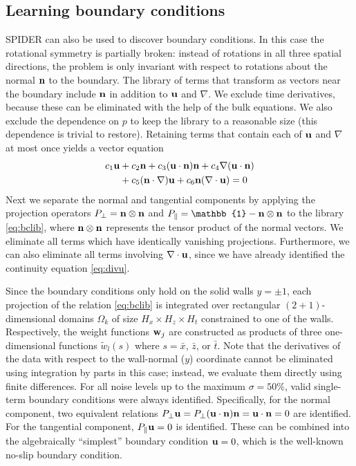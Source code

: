 \documentclass[9pt,twocolumn,twoside,lineno]{pnas-new}
\begin{document}
\subsection*{Learning boundary conditions}
SPIDER can also be used to discover boundary conditions. In this case the rotational symmetry is partially broken: instead of rotations in all three spatial directions, the problem is only invariant with respect to rotations about the normal ${\bf n}$ to the boundary. The library of terms that transform as vectors near the boundary include ${\bf n}$ in addition to ${\bf u}$ and $\nabla$. We exclude time derivatives, because these can be eliminated with the help of the bulk equations. We also exclude the dependence on $p$ to keep the library to a reasonable size (this dependence is trivial to restore). Retaining terms that contain each of ${\bf u}$ and $\nabla$ at most once yields a vector equation
\begin{align}\label{eq:bclib}
    c_1{\bf u}&+c_2{\bf n}+c_3({\bf u} \cdot {\bf n}){\bf n}+c_4\nabla({\bf u} \cdot {\bf n})\nonumber\\&+c_5({\bf n}\cdot \nabla){\bf u}+c_6{\bf n}(\nabla \cdot {\bf u})= 0
\end{align}
Next we separate the normal and tangential components by applying the projection operators $P_\perp={\bf n}\otimes{\bf n}$ and $P_\parallel=\mathbb{1}-{\bf n}\otimes{\bf n}$ to the library \eqref{eq:bclib}, where ${\bf n}\otimes{\bf n}$ represents the tensor product of the normal vectors. We eliminate all terms which have identically vanishing projections. Furthermore, we can also eliminate all terms involving $\nabla\cdot{\bf u}$, since we have already identified the continuity equation \eqref{eq:divu}.

Since the boundary conditions only hold on the solid walls $y=\pm 1$, each projection of the relation \eqref{eq:bclib} is integrated over rectangular $(2+1)$-dimensional domains $\Omega_k$ of size $H_x\times H_z\times H_t$ constrained to one of the walls. Respectively, the weight functions ${\bf w}_j$ are constructed as products of three one-dimensional functions $\tilde{w}_l(s)$ where $s=\bar{x}$, $\bar{z}$, or $\bar{t}$. Note that the derivatives of the data with respect to the wall-normal ($y$) coordinate cannot be eliminated using integration by parts in this case; instead, we evaluate them directly using finite differences.
For all noise levels up to the maximum $\sigma = 50\%$, valid single-term boundary conditions were always identified. Specifically, for the normal component, two equivalent relations $P_\perp {\bf u} = P_\perp ({\bf u} \cdot {\bf n}){\bf n} = {\bf u} \cdot {\bf n} = 0$ are identified. For the tangential component, $P_\parallel {\bf u} = 0$ is identified. These can be combined into the algebraically ``simplest'' boundary condition ${\bf u}=0$, which is the well-known no-slip boundary condition.
\end{document}
